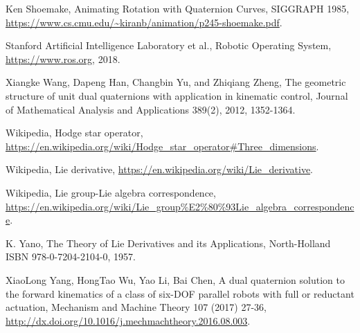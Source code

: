 \documentclass[reqno,12pt]{amsart}
\begin{document}
\begin{thebibliography}{99}
 Ken Shoemake, Animating Rotation with Quaternion Curves, SIGGRAPH 1985, \url{https://www.cs.cmu.edu/~kiranb/animation/p245-shoemake.pdf}.

 Stanford Artificial Intelligence Laboratory et al., Robotic Operating System, \url{https://www.ros.org}, 2018.

 Xiangke Wang, Dapeng Han, Changbin Yu, and Zhiqiang Zheng, The geometric structure of unit dual quaternions with application in kinematic control, Journal of Mathematical Analysis and Applications 389(2), 2012, 1352-1364.

 Wikipedia, Hodge star operator, \url{https://en.wikipedia.org/wiki/Hodge_star_operator#Three_dimensions}.

 Wikipedia, Lie derivative, \url{https://en.wikipedia.org/wiki/Lie_derivative}.

 Wikipedia, Lie group-Lie algebra correspondence, \url{https://en.wikipedia.org/wiki/Lie_group%E2%80%93Lie_algebra_correspondence}.

 K. Yano, The Theory of Lie Derivatives and its Applications, North-Holland ISBN 978-0-7204-2104-0, 1957.

 XiaoLong Yang, HongTao Wu, Yao Li, Bai Chen, A dual quaternion solution to the forward kinematics of a class of six-DOF parallel robots with full or reductant actuation, Mechanism and Machine Theory 107 (2017) 27-36, \url{http://dx.doi.org/10.1016/j.mechmachtheory.2016.08.003}.

\end{thebibliography}
\end{document}
